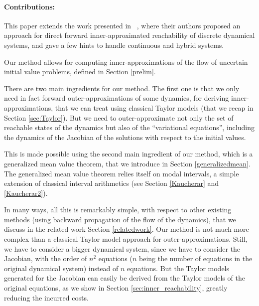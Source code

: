 \documentclass{sig-alternate-05-2015} %
\newcommand\ForAuthors[1]%
 {\par\smallskip                     %
  \begin{center}%
   \fbox%
   {\parbox{0.9\linewidth}%
    {\raggedright\sc--- #1}%
   }%
  \end{center}%
  \par\smallskip                     %
 }
\begin{document}
\paragraph{Contributions:}

This paper extends the work presented in ~\cite{sas07,hscc14}, where their authors proposed an approach for direct forward inner-approximated reachability of 
discrete dynamical systems, and gave a few hints to handle continuous and hybrid systems. 

Our method allows for 
computing inner-approximations of the flow of uncertain initial value problems, defined
in Section \ref{prelim}. 

There are two main ingredients for our method. The first one is that we only need in fact forward 
outer-approxima\-tions of some dynamics, for deriving inner-approximations, that we can treat using classical
Taylor models (that we recap in Section \ref{sec:Taylor}). But we need to outer-approximate not only 
the set of reachable states of the dynamics but also
of the ``variational equations'', including the dynamics of the Jacobian of the solutions with respect to the
initial values. 

This is made possible using the second main ingredient of our method, which is 
a generalized mean value theorem, that we introduce in Section \ref{generalizedmean}. 
The generalized mean value theorem relies itself on modal intervals, a simple 
extension of classical interval arithmetics (see Section \ref{Kaucherar} and \ref{Kaucherar2}). 

In many ways, all this is remarkably simple, with respect to other existing methods (using backward propagation
of the flow of the dynamics), that we discuss in the related work Section \ref{relatedwork}. Our method
is not much more complex than a classical Taylor model approach for outer-approximations. 
Still, we have to consider a bigger dynamical system, since we have to consider the Jacobian,
with the order of $n^2$ equations ($n$ being the number of equations in the original dynamical
system) instead of $n$ equations. But the Taylor models generated for the Jacobian can easily be derived from
the Taylor models of the original equations, as we show in Section \ref{sec:inner_reachability},
greatly reducing the incurred costs.  
\end{document}
